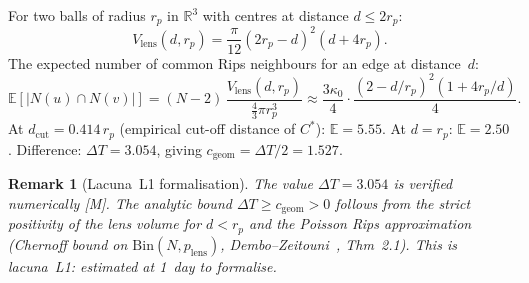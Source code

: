 \documentclass[11pt, a4paper]{article}
\newtheorem{remark}{Remark}
\begin{document}
For two balls of radius $r_p$ in $\mathbb{R}^3$ with centres at
distance $d\le2r_p$:
\[
  V_{\mathrm{lens}}(d,r_p)
  =\frac{\pi}{12}(2r_p-d)^2(d+4r_p).
\]
The expected number of common Rips neighbours for an edge at distance~$d$:
\[
  \mathbb{E}[|N(u)\cap N(v)|]
  = (N-2)\,\frac{V_{\mathrm{lens}}(d,r_p)}{\frac43\pi r_p^3}
  \approx \frac{3\kappa_0}{4}\cdot
  \frac{(2-d/r_p)^2(1+4r_p/d)}{4}.
\]
At $d_{\mathrm{cut}}=0.414\,r_p$ (empirical cut-off distance of $C^*$):
$\mathbb{E}=5.55$.
At $d=r_p$: $\mathbb{E}=2.50$.
Difference: $\Delta T=3.054$, giving
$c_{\mathrm{geom}}=\Delta T/2=1.527$.

\begin{remark}[Lacuna~L1 formalisation]
The value $\Delta T=3.054$ is verified numerically [M].
The analytic bound $\Delta T\ge c_{\mathrm{geom}}>0$
follows from the strict positivity of the lens volume
for $d<r_p$ and the Poisson Rips approximation
(Chernoff bound on $\mathrm{Bin}(N,p_{\mathrm{lens}})$,
Dembo--Zeitouni~\cite{DemboZeitouni}, Thm~2.1).
This is lacuna~L1: estimated at 1~day to formalise.
\end{remark}
\end{document}
